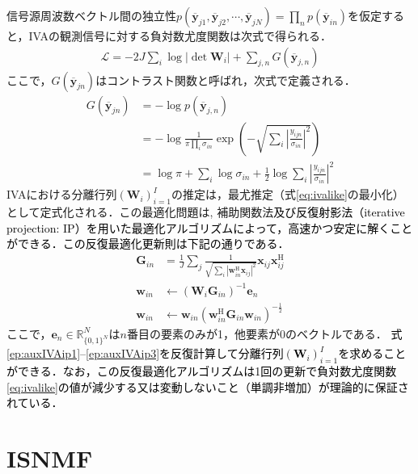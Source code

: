 信号源周波数ベクトル間の独立性$p(\overline{\bm{y}}_{j1}, \overline{\bm{y}}_{j2}, \cdots, \overline{\bm{y}}_{jN}) = \prod_n p(\overline{\bm{y}}_{in})$を仮定すると，IVAの観測信号に対する負対数尤度関数は次式で得られる．
\begin{align}
    \mathcal{L} = -2J \sum_i \log |\det \bm{W}_i| + \sum_{j,n} G(\overline{\bm{y}}_{j,n})
    \label{eq:ivalike}
\end{align}
ここで，$G(\overline{\bm{y}}_{jn})$はコントラスト関数と呼ばれ，次式で定義される．
\begin{align}
  \nonumber G(\overline{\bm{y}}_{jn}) &= -\log p(\overline{\bm{y}}_{j,n}) \\
  \nonumber  &= -\log \frac{1}{\pi \prod_{i} \sigma_{in}} \exp \left(  - \sqrt{ \sum_i \left| \frac{y_{ijn}}{\sigma_{in}} \right|^2}  \right) \\
  &= \log \pi + \sum_i \log \sigma_{in} + \frac{1}{2} \log \sum_i \left| \frac{y_{ijn}}{\sigma_{in}}\right|^2
\end{align}
IVAにおける分離行列$( \bm{W}_i )_{i=1}^I$の推定は，最尤推定（式\eqref{eq:ivalike}の最小化）として定式化される．この最適化問題は, 補助関数法\cite{auxfunc}\textcolor{black}{及び反復射影法（iterative projection: IP）\cite{auxIVA}を用いた最適化アルゴリズムによって，高速かつ安定に解くことができる\cite{stable_auxIVA}．この反復最適化更新則は下記の通りである．}
\begin{align}
\bm{G}_{in} &= \frac{1}{J} \sum_j \frac{1}{\sqrt{\sum_{i} |\bm{w}_{in}^\mathrm{H}\bm{x}_{ij}|^{2}}} \bm{x}_{ij} \bm{x}_{ij}^{\mathrm{H}} \label{ep:auxIVAip1} \\
\bm{w}_{in} &\leftarrow (\bm{W}_i \bm{G}_{in})^{-1} \bm{e}_n \label{ep:auxIVAip2} \\
\bm{w}_{in} &\leftarrow \bm{w}_{in} ( \bm{w}_{in}^{\mathrm{H}} \bm{G}_{in} \bm{w}_{in} )^{-\frac{1}{2}} \label{ep:auxIVAip3}
\end{align}
ここで，$\bm{e}_{n} \in \mathbb{R}^{N}_{\{ 0, 1 \}^N}$は$n$番目の要素のみが1，他要素が0のベクトルである．
\textcolor{black}{式\eqref{ep:auxIVAip1}--\eqref{ep:auxIVAip3}を反復計算して分離行列$( \bm{W}_i )_{i=1}^I$を求めることができる．なお，この反復最適化アルゴリズムは1回の更新で負対数尤度関数\eqref{eq:ivalike}の値が減少する又は変動しないこと（単調非増加）が理論的に保証されている．}


\section{ISNMF}
\label{sec:conv:isnmf}

